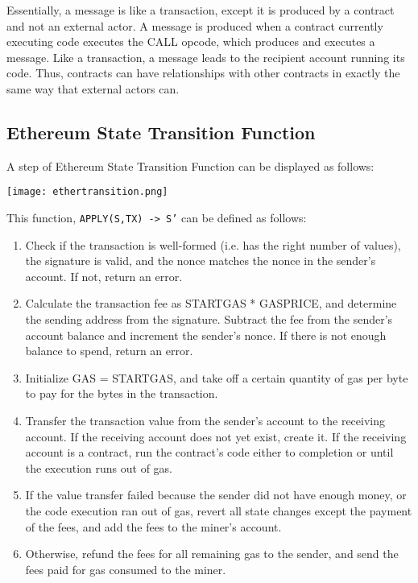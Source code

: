 Essentially, a message is like a transaction, except it is produced by a contract and not an external actor. A message is produced when a contract currently executing code executes the CALL opcode, which produces and executes a message. \newline
Like a transaction, a message leads to the recipient account running its code. Thus, contracts can have relationships with other contracts in exactly the same way that external actors can.

\subsection{Ethereum State Transition Function}
A step of Ethereum State Transition Function can be displayed as follows:
\begin{center}
    \texttt{[image: ethertransition.png]}
\end{center}
This function, \texttt{APPLY(S,TX) -> S'} can be defined as follows:
\begin{enumerate}
    \item Check if the transaction is well-formed (i.e. has the right number of values), the signature is valid, and the nonce matches the nonce in the sender's account. If not, return an error.
    \item Calculate the transaction fee as STARTGAS * GASPRICE, and determine the sending address from the signature. Subtract the fee from the sender's account balance and increment the sender's nonce. If there is not enough balance to spend, return an error.
    \item Initialize GAS = STARTGAS, and take off a certain quantity of gas per byte to pay for the bytes in the transaction.
    \item Transfer the transaction value from the sender's account to the receiving account. If the receiving account does not yet exist, create it. If the receiving account is a contract, run the contract's code either to completion or until the execution runs out of gas.
    \item If the value transfer failed because the sender did not have enough money, or the code execution ran out of gas, revert all state changes except the payment of the fees, and add the fees to the miner's account.
    \item Otherwise, refund the fees for all remaining gas to the sender, and send the fees paid for gas consumed to the miner.
\end{enumerate}

